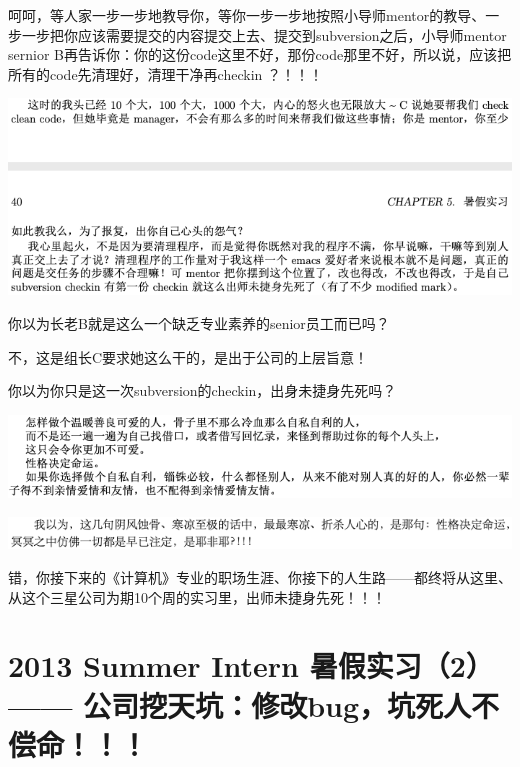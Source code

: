 \documentclass[9pt, b5paper]{article}
\begin{document}
呵呵，等人家一步一步地教导你，等你一步一步地按照小导师mentor的教导、一步一步把你应该需要提交的内容提交上去、提交到subversion之后，小导师mentor sernior B再告诉你：你的这份code这里不好，那份code那里不好，所以说，应该把所有的code先清理好，清理干净再checkin ？！！！

\begin{center}
\includegraphics[width=.9\linewidth]{./pic/backups_plans_20210505_140038.png}
\end{center}

你以为长老B就是这么一个缺乏专业素养的senior员工而已吗？

不，这是组长C要求她这么干的，是出于公司的上层旨意！

你以为你只是这一次subversion的checkin，出身未捷身先死吗？

\begin{center}
\includegraphics[width=.9\linewidth]{./pic/backups_plans_20210413_131623.png}
\end{center}

\begin{center}
\includegraphics[width=.9\linewidth]{./pic/backups_plans_20210505_140554.png}
\end{center}

错，你接下来的《计算机》专业的职场生涯、你接下的人生路——都终将从这里、从这个三星公司为期10个周的实习里，出师未捷身先死！！！

\section{2013 Summer Intern 暑假实习（2） —— 公司挖天坑：修改bug，坑死人不偿命！！！}
\label{sec:org48d9802}
\end{document}
